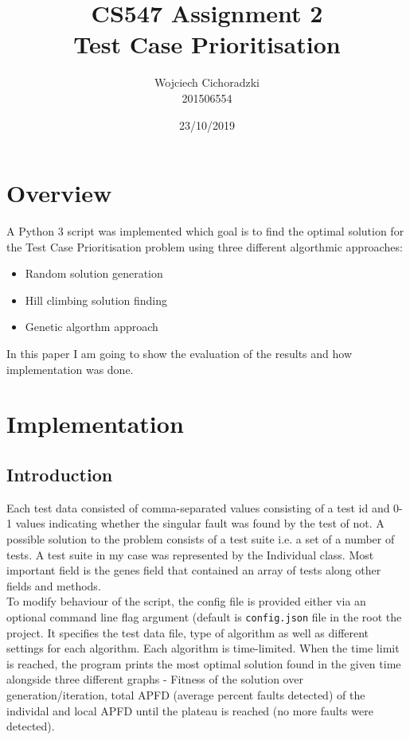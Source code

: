 \documentclass[12pt]{article}
\title{CS547 Assignment 2\\Test Case Prioritisation}
\author{Wojciech Cichoradzki\\201506554}
\date{23/10/2019}
\begin{document}
\maketitle

\section{Overview}
A Python 3 script was implemented which goal is to find the optimal solution for the Test Case Prioritisation problem using three different algorthmic approaches:
\begin{itemize}
  \item Random solution generation
  \item Hill climbing solution finding
  \item Genetic algorthm approach
\end{itemize}
In this paper I am going to show the evaluation of the results and how implementation was done.

\section{Implementation}
\subsection{Introduction}
Each test data consisted of comma-separated values consisting of a test id and 0-1 values indicating whether the singular fault was found by the test of not. A possible solution to the problem consists of a test suite i.e. a set of a number of tests. A test suite in my case was represented by the Individual class. Most important field is the genes field that contained an array of tests along other fields and methods.\\
To modify behaviour of the script, the config file is provided either via an optional command line flag argument (default is \texttt{config.json} file in the root the project. It specifies the test data file, type of algorithm as well as different settings for each algorithm. Each algorithm is time-limited. When the time limit is reached, the program prints the most optimal solution found in the given time alongside three different graphs - Fitness of the solution over generation/iteration, total APFD (average percent faults detected) of the individal and local APFD until the plateau is reached (no more faults were detected).
\end{document}
